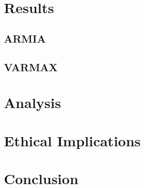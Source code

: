 \documentclass[12pt]{article}
\begin{document}
\section{Results}

\subsection{ARMIA}

\subsection{VARMAX}

\section{Analysis}

\section{Ethical Implications}

\section{Conclusion}
\end{document}
